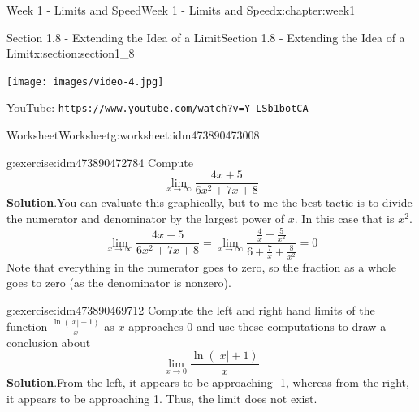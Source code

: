 \documentclass[oneside,10pt,]{book}
\newcommand{\blocktitlefont}{\relax}
\newcommand{\mono}[1]{\texttt{#1}}
\numberwithin{equation}{section}
\newlength{\qrsize}
\newlength{\previewwidth}
\begin{document}
\begin{chapterptx}{Week 1 - Limits and Speed}{}{Week 1 - Limits and Speed}{}{}{x:chapter:week1}
\begin{sectionptx}{Section 1.8 - Extending the Idea of a Limit}{}{Section 1.8 - Extending the Idea of a Limit}{}{}{x:section:section1_8}
\begin{tcbraster}[raster columns=2, raster column skip=1pt, raster halign=center, raster force size=false, raster left skip=0pt, raster right skip=0pt]
\begin{tcolorbox}[previewstyle, width=\previewwidth]%
\texttt{[image: images/video-4.jpg]}%
\end{tcolorbox}%
\begin{tcolorbox}[qrstyle]%
{\hypersetup{urlcolor=black}}%
\end{tcolorbox}%
\begin{tcolorbox}[captionstyle]%
\small YouTube: \mono{https://www.youtube.com/watch?v=Y\_LSb1botCA}\end{tcolorbox}%
\end{tcbraster}%
%
%
\typeout{************************************************}
\typeout{************************************************}
%
\begin{worksheet-subsection}{Worksheet}{}{Worksheet}{}{}{g:worksheet:idm473890473008}
\begin{divisionexercise}{1}{}{}{g:exercise:idm473890472784}%
Compute%
\begin{equation*}
\lim_{x\to \infty} \frac{4x+5}{6x^2+7x+8}
\end{equation*}
%
\textbf{\blocktitlefont Solution}.\hypertarget{g:solution:idm473890472656}{}\quad{}You can evaluate this graphically, but to me the best tactic is to divide the numerator and denominator by the largest power of \(x\). In this case that is \(x^2\).%
\begin{equation*}
\lim_{x\to \infty} \frac{4x+5}{6x^2+7x+8} = \lim_{x\to \infty} \frac{\frac4x+\frac5{x^2}}{6+\frac7x+\frac8{x^2}} = 0 
\end{equation*}
Note that everything in the numerator goes to zero, so the fraction as a whole goes to zero (as the denominator is nonzero).%
\end{divisionexercise}%
\begin{divisionexercise}{2}{}{}{g:exercise:idm473890469712}%
Compute the left and right hand limits of the function \(\frac{\ln(|x|+1)}{x}\) as \(x\) approaches 0 and use these computations to draw a conclusion about%
\begin{equation*}
\lim_{x\to 0} \frac{\ln(|x|+1)}{x}
\end{equation*}
%
\textbf{\blocktitlefont Solution}.\hypertarget{g:solution:idm473890476576}{}\quad{}From the left, it appears to be approaching -1, whereas from the right, it appears to be approaching 1. Thus, the limit does not exist.%
\par

\end{divisionexercise}
\end{worksheet-subsection}
\end{sectionptx}
\end{chapterptx}
\end{document}
